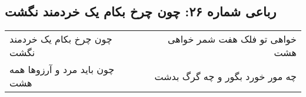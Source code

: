 \begin{center}
\section*{رباعی شماره ۲۶: چون چرخ بکام یک خردمند نگشت}
\label{sec:sh026}
\begin{longtable}{l p{0.5cm} r}
چون چرخ بکام یک خردمند نگشت
&&
خواهی تو فلک هفت شمر خواهی هشت
\\
چون باید مرد و آرزوها همه هشت
&&
چه مور خورد بگور و چه گرگ بدشت
\\
\end{longtable}
\end{center}
